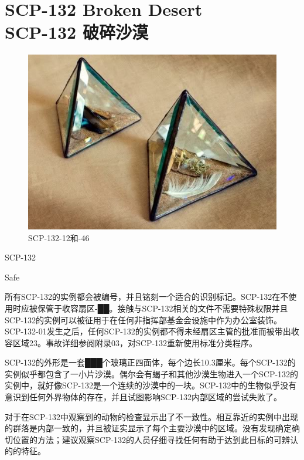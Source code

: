 \chapter[SCP-132 破碎沙漠]{
    SCP-132 Broken Desert\\
    SCP-132 破碎沙漠
}

\label{chap:SCP-132}

\begin{figure}[H]
    \centering
    \includegraphics[width=0.5\linewidth]{images/SCP.132.jpg}
    \caption*{SCP-132-12和-46}
\end{figure}

SCP-132

Safe

所有SCP-132的实例都会被编号，并且铭刻一个适合的识别标记。SCP-132在不使用时应被保管于收容扇区-██。接触与SCP-132相关的文件不需要特殊权限并且SCP-132的实例可以被征用于在任何非指挥部基金会设施中作为办公室装饰。SCP-132-01发生之后，任何SCP-132的实例都不得未经扇区主管的批准而被带出收容区域23。事故详细参阅附录03，对SCP-132重新使用标准分类程序。

SCP-132的外形是一套███个玻璃正四面体，每个边长10.3厘米。每个SCP-132的实例似乎都包含了一小片沙漠。偶尔会有蝎子和其他沙漠生物进入一个SCP-132的实例中，就好像SCP-132是一个连续的沙漠中的一块。SCP-132中的生物似乎没有意识到任何外界物体的存在，并且试图影响SCP-132内部区域的尝试失败了。

对于在SCP-132中观察到的动物的检查显示出了不一致性。相互靠近的实例中出现的群落是内部一致的，并且被证实显示了每个主要沙漠中的区域。没有发现确定确切位置的方法；建议观察SCP-132的人员仔细寻找任何有助于达到此目标的可辨认的的特征。

